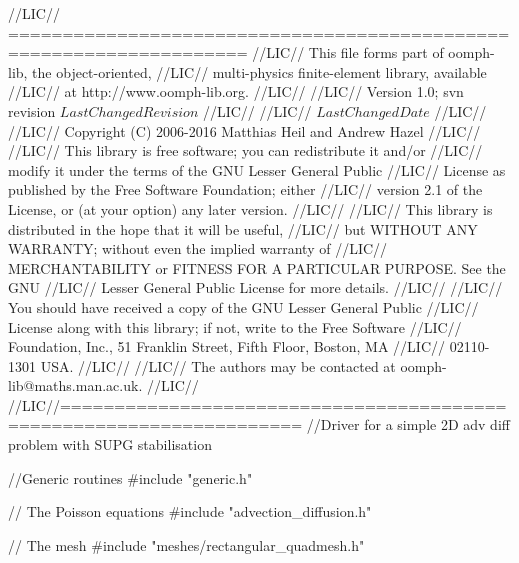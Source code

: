 \begin{DoxyCodeInclude}
\textcolor{comment}{//LIC// ====================================================================}
\textcolor{comment}{//LIC// This file forms part of oomph-lib, the object-oriented, }
\textcolor{comment}{//LIC// multi-physics finite-element library, available }
\textcolor{comment}{//LIC// at http://www.oomph-lib.org.}
\textcolor{comment}{//LIC// }
\textcolor{comment}{//LIC//    Version 1.0; svn revision $LastChangedRevision$}
\textcolor{comment}{//LIC//}
\textcolor{comment}{//LIC// $LastChangedDate$}
\textcolor{comment}{//LIC// }
\textcolor{comment}{//LIC// Copyright (C) 2006-2016 Matthias Heil and Andrew Hazel}
\textcolor{comment}{//LIC// }
\textcolor{comment}{//LIC// This library is free software; you can redistribute it and/or}
\textcolor{comment}{//LIC// modify it under the terms of the GNU Lesser General Public}
\textcolor{comment}{//LIC// License as published by the Free Software Foundation; either}
\textcolor{comment}{//LIC// version 2.1 of the License, or (at your option) any later version.}
\textcolor{comment}{//LIC// }
\textcolor{comment}{//LIC// This library is distributed in the hope that it will be useful,}
\textcolor{comment}{//LIC// but WITHOUT ANY WARRANTY; without even the implied warranty of}
\textcolor{comment}{//LIC// MERCHANTABILITY or FITNESS FOR A PARTICULAR PURPOSE.  See the GNU}
\textcolor{comment}{//LIC// Lesser General Public License for more details.}
\textcolor{comment}{//LIC// }
\textcolor{comment}{//LIC// You should have received a copy of the GNU Lesser General Public}
\textcolor{comment}{//LIC// License along with this library; if not, write to the Free Software}
\textcolor{comment}{//LIC// Foundation, Inc., 51 Franklin Street, Fifth Floor, Boston, MA}
\textcolor{comment}{//LIC// 02110-1301  USA.}
\textcolor{comment}{//LIC// }
\textcolor{comment}{//LIC// The authors may be contacted at oomph-lib@maths.man.ac.uk.}
\textcolor{comment}{//LIC// }
\textcolor{comment}{//LIC//====================================================================}
\textcolor{comment}{//Driver for a simple 2D adv diff problem with SUPG stabilisation}

\textcolor{comment}{//Generic routines}
\textcolor{preprocessor}{#include "generic.h"}

\textcolor{comment}{// The Poisson equations}
\textcolor{preprocessor}{#include "advection\_diffusion.h"}

\textcolor{comment}{// The mesh }
\textcolor{preprocessor}{#include "meshes/rectangular\_quadmesh.h"}


\end{DoxyCodeInclude}
